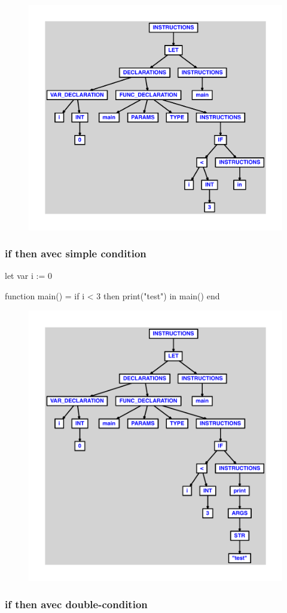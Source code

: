 \documentclass{article}
\begin{document}
\begin{figure}[H]\centering\includegraphics[max width=\textwidth]{ast/ast_250.pdf}\end{figure}\subsubsection{if then avec simple condition}
\begin{verbatimtab}
let
	var i := 0

	function main() =
		if i < 3 then
			print("test")
in main() end
\end{verbatimtab}
\begin{figure}[H]\centering\includegraphics[max width=\textwidth]{ast/ast_251.pdf}\end{figure}\subsubsection{if then avec double-condition}
\end{document}
